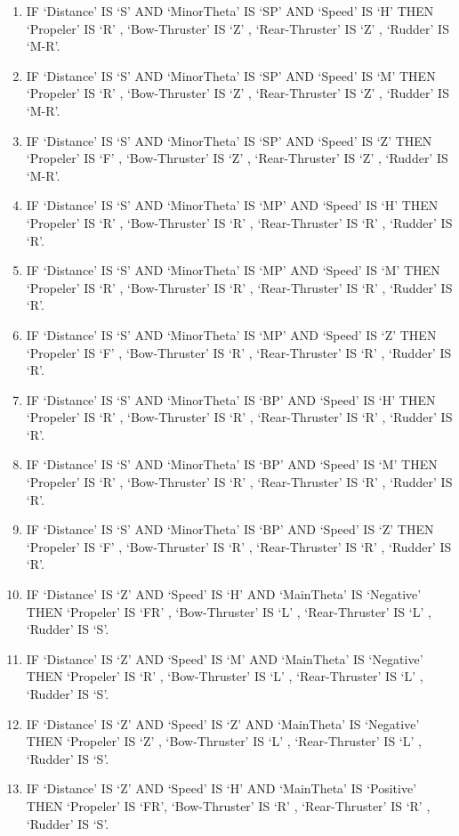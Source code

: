 \begin{enumerate}
\item	IF  ‘Distance’  IS  ‘S’   AND  ‘MinorTheta’ IS  ‘SP’  AND ‘Speed’ IS ‘H’  THEN ‘Propeler’ IS ‘R’ ,  ‘Bow-Thruster’ IS ‘Z’  ,  ‘Rear-Thruster’ IS  ‘Z’  ,  ‘Rudder’ IS ‘M-R’. 
\item	IF ‘Distance’ IS ‘S’   AND ‘MinorTheta’ IS ‘SP’  AND ‘Speed’ IS ‘M’  THEN ‘Propeler’ IS  ‘R’  ,  ‘Bow-Thruster’ IS ‘Z’  ,  ‘Rear-Thruster’ IS  ‘Z’  ,  ‘Rudder’ IS ‘M-R’. 
\item	IF ‘Distance’ IS ‘S’   AND ‘MinorTheta’ IS ‘SP’  AND ‘Speed’ IS ‘Z’   THEN  ‘Propeler’ IS ‘F’ ,  ‘Bow-Thruster’ IS ‘Z’  ,  ‘Rear-Thruster’ IS  ‘Z’  ,  ‘Rudder’ IS ‘M-R’. 
\item	IF ‘Distance’ IS ‘S’   AND ‘MinorTheta’ IS  ‘MP’  AND ‘Speed’ IS ‘H’  THEN ‘Propeler’ IS ‘R’ ,  ‘Bow-Thruster’ IS ‘R’  ,  ‘Rear-Thruster’ IS  ‘R’  ,  ‘Rudder’ IS ‘R’. 
\item	IF ‘Distance’ IS ‘S’   AND ‘MinorTheta’ IS ‘MP’  AND ‘Speed’ IS ‘M’  THEN ‘Propeler’ IS  ‘R’  ,  ‘Bow-Thruster’ IS ‘R’  ,  ‘Rear-Thruster’ IS  ‘R’  ,  ‘Rudder’ IS ‘R’. 
\item	IF ‘Distance’ IS ‘S’   AND ‘MinorTheta’ IS ‘MP’  AND ‘Speed’ IS ‘Z’   THEN  ‘Propeler’ IS ‘F’ ,  ‘Bow-Thruster’ IS ‘R’  ,  ‘Rear-Thruster’ IS  ‘R’  ,  ‘Rudder’ IS ‘R’. 
\item	IF ‘Distance’ IS ‘S’   AND ‘MinorTheta’ IS ‘BP’  AND ‘Speed’ IS ‘H’  THEN ‘Propeler’ IS ‘R’ ,  ‘Bow-Thruster’ IS ‘R’  ,  ‘Rear-Thruster’ IS  ‘R’  ,  ‘Rudder’ IS ‘R’. 
\item	IF ‘Distance’ IS ‘S’   AND ‘MinorTheta’ IS ‘BP’  AND ‘Speed’ IS ‘M’  THEN ‘Propeler’ IS  ‘R’  ,  ‘Bow-Thruster’ IS  ‘R’  ,  ‘Rear-Thruster’ IS  ‘R’  ,  ‘Rudder’ IS ‘R’. 
\item	IF ‘Distance’ IS ‘S’   AND ‘MinorTheta’ IS ‘BP’  AND ‘Speed’ IS ‘Z’   THEN  ‘Propeler’ IS ‘F’ ,  ‘Bow-Thruster’ IS ‘R’  ,  ‘Rear-Thruster’ IS  ‘R’  ,  ‘Rudder’ IS ‘R’. 
\item	IF ‘Distance’ IS ‘Z’   AND ‘Speed’ IS ‘H’  AND ‘MainTheta’ IS ‘Negative’ THEN ‘Propeler’ IS  ‘FR’ ,  ‘Bow-Thruster’ IS ‘L’  ,  ‘Rear-Thruster’ IS  ‘L’  ,  ‘Rudder’ IS ‘S’. 
\item IF ‘Distance’ IS ‘Z’   AND ‘Speed’ IS ‘M’  AND ‘MainTheta’ IS ‘Negative’ THEN ‘Propeler’ IS ‘R’ ,  ‘Bow-Thruster’ IS ‘L’  ,  ‘Rear-Thruster’ IS  ‘L’  ,  ‘Rudder’ IS ‘S’. 
\item	IF ‘Distance’ IS ‘Z’   AND ‘Speed’ IS ‘Z’  AND ‘MainTheta’ IS ‘Negative’ THEN ‘Propeler’ IS ‘Z’ ,  ‘Bow-Thruster’ IS ‘L’  ,  ‘Rear-Thruster’ IS  ‘L’  ,  ‘Rudder’ IS ‘S’. 
\item	IF ‘Distance’ IS ‘Z’   AND ‘Speed’ IS ‘H’  AND ‘MainTheta’ IS ‘Positive’ THEN ‘Propeler’ IS ‘FR’,  ‘Bow-Thruster’ IS ‘R’  ,  ‘Rear-Thruster’ IS  ‘R’  ,  ‘Rudder’ IS ‘S’. 

\end{enumerate}
